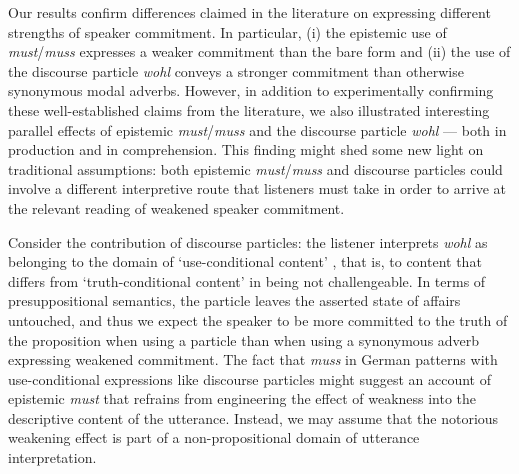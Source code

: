 \documentclass[11pt]{article}
\begin{document}
Our results confirm differences claimed in the literature on expressing different strengths of speaker commitment. In particular, (i) the epistemic use of \emph{must}/\emph{muss} expresses a weaker commitment than the bare form and (ii) the use of the discourse particle \emph{wohl} conveys a stronger commitment than otherwise synonymous modal adverbs. However, in addition to experimentally confirming these well-established claims from the literature, we also illustrated interesting parallel effects of epistemic \emph{must}/\emph{muss} and the discourse particle \emph{wohl} — both in production and in comprehension. This finding might shed some new light on traditional assumptions: both epistemic  \emph{must}/\emph{muss} and discourse particles could involve a different interpretive route that listeners must take in order to arrive at the relevant reading of weakened speaker commitment. %

Consider the contribution of discourse particles: the listener interprets \emph{wohl} as belonging to the domain of ‘use-conditional content’ \citep{Recanati2004}, that is, to content that differs from ‘truth-conditional content’ in being not challengeable. In terms of presuppositional semantics, the particle leaves the asserted state of affairs untouched, and thus we expect the speaker to be more committed to the truth of the proposition when using a particle than when using a synonymous adverb expressing weakened commitment. %
The fact that \emph{muss} in German patterns with use-conditional expressions like discourse particles might suggest an account of epistemic \emph{must} that refrains from engineering the effect of weakness into the descriptive content of the utterance. Instead, we may assume that the notorious weakening effect is part of a non-propositional domain of utterance interpretation. 
\end{document}
